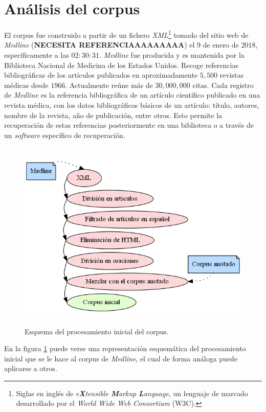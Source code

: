 \section{Análisis del corpus}
El corpus fue construido a partir de un fichero \textit{XML}\footnote{Siglas en inglés de \textit{e\textbf{X}tensible \textbf{M}arkup \textbf{L}anguage}, un lenguaje de marcado desarrollado por el \textit{World Wide Web Consortium} (W3C).} tomado del sitio web de \textit{Medline} (\textbf{NECESITA REFERENCIAAAAAAAAA}) el $9$ de enero de $2018$, específicamente a las $02:30:31$. \textit{Medline} fue producida y es mantenida por la Biblioteca Nacional de Medicina de los Estados Unidos. Recoge referencias bibliográficas de los artículos publicados en aproximadamente $5,500$ revistas médicas desde $1966$. Actualmente reúne más de $30,000,000$ citas. Cada registro de \textit{Medline} es la referencia bibliográfica de un artículo científico publicado en una revista médica, con los datos bibliográficos básicos de un artículo: título, autores, nombre de la revista, año de publicación, entre otros. Esto permite la recuperación de estas referencias posteriormente en una biblioteca o a través de un \textit{software} específico de recuperación.

\begin{figure}[H]
	\begin{center}
		\includegraphics[height=3.6in]{graphics/corpus_processing.png}
		\caption[Esquema del procesamiento inicial del corpus]{Esquema del procesamiento inicial del corpus.}
		\label{fig:corpus_processing}
	\end{center}
\end{figure}

En la figura \ref{fig:corpus_processing} puede verse una representación esquemática del procesamiento inicial que se le hace al corpus de \textit{Medline}, el cual de forma análoga puede aplicarse a otros.